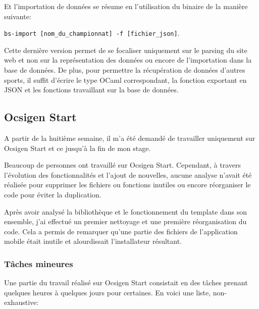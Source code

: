 Et l'importation de données se résume en l'utilisation du binaire de la manière
suivante:

\verb|bs-import [nom_du_championnat] -f [fichier_json]|.

Cette dernière version permet de se focaliser uniquement sur le parsing du site
web et non sur la représentation des données ou encore de l'importation dans la
base de données.
De plus, pour permettre la récupération de données d'autres sports, il suffit
d'écrire le type OCaml correspondant, la fonction exportant en JSON et les
fonctions travaillant sur la base de données.

\subsection{Ocsigen Start}

A partir de la huitième semaine, il m'a été demandé de travailler uniquement sur
Ocsigen Start et ce jusqu'à la fin de mon stage.

Beaucoup de personnes ont travaillé sur Ocsigen Start. Cependant, à
travers l'évolution des fonctionnalités et l'ajout de nouvelles, aucune analyse
n'avait été réalisée pour supprimer les fichiers ou fonctions inutiles ou encore
réorganiser le code pour éviter la duplication.

Après avoir analysé la bibliothèque et le fonctionnement du template dans son
ensemble, j'ai effectué un premier nettoyage et une première réorganisation du
code. Cela a permis de remarquer qu'une partie des fichiers de l'application
mobile était inutile et alourdissait l'installateur résultant.

\subsubsection*{Tâches mineures}

Une partie du travail réalisé sur Ocsigen Start consistait en des tâches prenant
quelques heures à quelques jours pour certaines. En voici une liste,
non-exhaustive:

